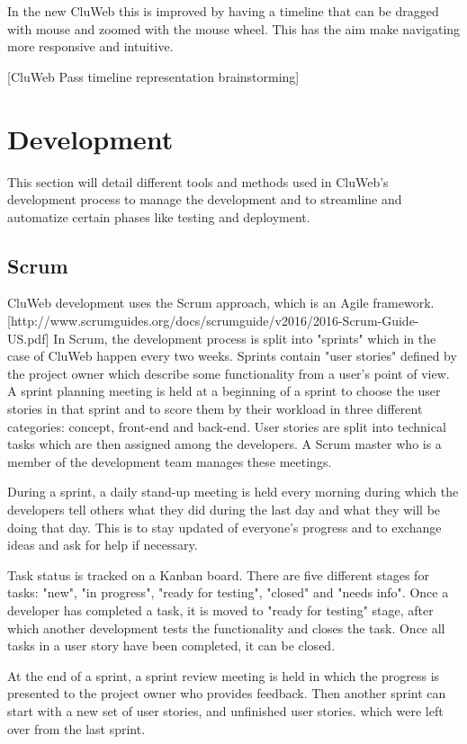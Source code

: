 In the new CluWeb this is improved by having a timeline that can be dragged with mouse and zoomed with the mouse wheel. This has the aim make navigating more responsive and intuitive.



[CluWeb Pass timeline representation brainstorming]

\section{Development}
This section will detail different tools and methods used in CluWeb's development process to manage the development and to streamline and automatize certain phases like testing and deployment.

\subsection{Scrum}
CluWeb development uses the Scrum approach, which is an Agile framework. [http://www.scrumguides.org/docs/scrumguide/v2016/2016-Scrum-Guide-US.pdf]
In Scrum, the development process is split into "sprints" which in the case of CluWeb happen every two weeks. Sprints contain "user stories" defined by the project owner which describe some functionality from a user's point of view. A sprint planning meeting is held at a beginning of a sprint to choose the user stories in that sprint and to score them by their workload in three different categories: concept, front-end and back-end. User stories are split into technical tasks which are then assigned among the developers. A Scrum master who is a member of the development team manages these meetings.

During a sprint, a daily stand-up meeting is held every morning during which the developers tell others what they did during the last day and what they will be doing that day. This is to stay updated of everyone's progress and to exchange ideas and ask for help if necessary.

Task status is tracked on a Kanban board. There are five different stages for tasks: "new", "in progress", "ready for testing", "closed" and "needs info". Once a developer has completed a task, it is moved to "ready for testing" stage, after which another development tests the functionality and closes the task. Once all tasks in a user story have been completed, it can be closed.

At the end of a sprint, a sprint review meeting is held in which the progress is presented to the project owner who provides feedback. Then another sprint can start with a new set of user stories, and unfinished user stories. which were left over from the last sprint.

